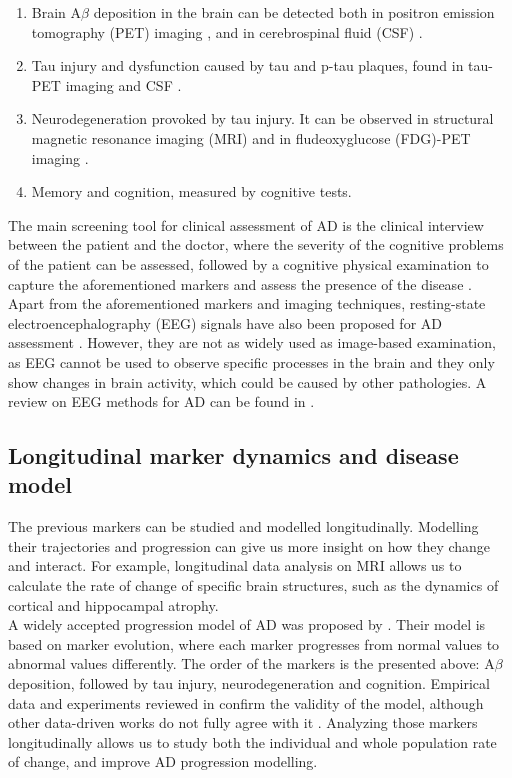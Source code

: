 \begin{enumerate}\itemsep5pt
\item Brain A$\beta$ deposition in the brain can be detected both in positron emission tomography (PET) imaging \cite{Clark2011}, and in cerebrospinal fluid (CSF) \cite{Andreasen1999}.
\item Tau injury and dysfunction caused by tau and p-tau plaques, found in tau-PET imaging and CSF \cite{Andreasen1999,Blennow2010}.
\item Neurodegeneration provoked by tau injury. It can be observed in structural magnetic resonance imaging (MRI) \cite{Weiner2005} and in fludeoxyglucose (FDG)-PET imaging \cite{Chetelat2003}.
\item Memory and cognition, measured by cognitive tests.
\end{enumerate}

The main screening tool for clinical assessment of AD is the clinical interview between the patient and the doctor, where the severity of the cognitive problems of the patient can be assessed, followed by a cognitive physical examination to capture the aforementioned markers and assess the presence of the disease \cite{Lane2018}. \\

Apart from the aforementioned markers and imaging techniques, resting-state electroencephalography (EEG) signals have also been proposed for AD assessment \cite{Al-Qazzaz2014,Bhat2015}. However, they are not as widely used as image-based examination, as EEG cannot be used to observe specific processes in the brain and they only show changes in brain activity, which could be caused by other pathologies. A review on EEG methods for AD can be found in \cite{Houmani2018}.

\subsection*{Longitudinal marker dynamics and disease model}

The previous markers can be studied and modelled longitudinally. Modelling their trajectories and progression can give us more insight on how they change and interact. For example, longitudinal data analysis on MRI allows us to calculate the rate of change of specific brain structures, such as the dynamics of cortical and hippocampal atrophy. \\

A widely accepted progression model of AD was proposed by \cite{Jack2010}. Their model is based on marker evolution, where each marker progresses from normal values to abnormal values differently. The order of the markers is the presented above: A$\beta$ deposition, followed by tau injury, neurodegeneration and cognition. Empirical data and experiments reviewed in \cite{Jack2013} confirm the validity of the model, although other data-driven works do not fully agree with it \cite{Iturria-Medina2016}. Analyzing those markers longitudinally allows us to study both the individual and whole population rate of change, and improve AD progression modelling. \\

